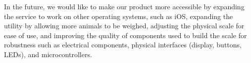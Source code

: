 In the future, we would like to make our product more accessible by expanding the service to work on other operating systems, such as iOS, expanding the utility by allowing more animals to be weighed, adjusting the physical scale for ease of use, and improving the quality of components used to build the scale for robustness such as electrical components, physical interfaces (display, buttons, LEDs), and microcontrollers. 

